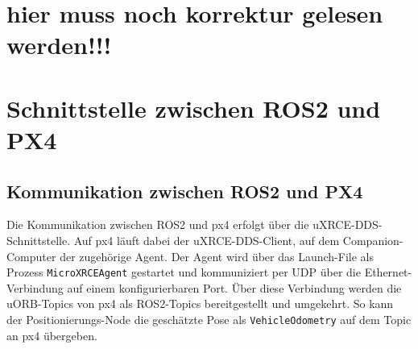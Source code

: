 \section{hier muss noch korrektur gelesen werden!!!}
\section{Schnittstelle zwischen ROS2 und PX4}
\subsection{Kommunikation zwischen ROS2 und PX4}
\label{subsec:kommunikation_ros2_px4}
Die Kommunikation zwischen ROS2 und \gls{px4} erfolgt über die uXRCE-DDS-Schnittstelle.
Auf \gls{px4} läuft dabei der uXRCE-DDS-Client, auf dem Companion-Computer der zugehörige Agent.
Der Agent wird über das Launch-File als Prozess \texttt{MicroXRCEAgent} gestartet und kommuniziert per UDP über die Ethernet-Verbindung auf einem konfigurierbaren Port.
Über diese Verbindung werden die uORB-Topics von \gls{px4} als ROS2-Topics bereitgestellt und umgekehrt.
So kann der Positionierungs-Node die geschätzte Pose als \texttt{VehicleOdometry} auf dem Topic  an \gls{px4} übergeben.

